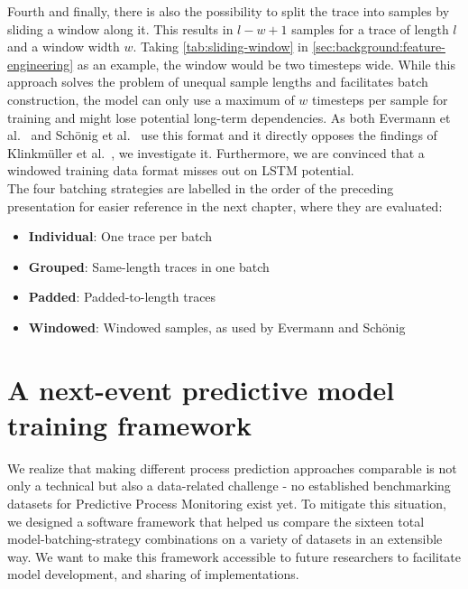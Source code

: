 Fourth and finally, there is also the possibility to split the trace into samples by sliding a window along it. This results in $l-w+1$ samples for a trace of length $l$ and a window width $w$. Taking \autoref{tab:sliding-window} in \autoref{sec:background:feature-engineering} as an example, the window would be two timesteps wide. While this approach solves the problem of unequal sample lengths and facilitates batch construction, the model can only use a maximum of $w$ timesteps per sample for training and might lose potential long-term dependencies. As both Evermann et al.~\cite{evermann2016} and Schönig et al.~\cite{schoenig2018} use this format and it directly opposes the findings of Klinkmüller et al.~\cite{klinkmuller2018reliablemonitoring}, we investigate it. Furthermore, we are convinced that a windowed training data format misses out on LSTM potential.\\

The four batching strategies are labelled in the order of the preceding presentation for easier reference in the next chapter, where they are evaluated:
\begin{itemize}
\item\textbf{Individual}: One trace per batch
\item\textbf{Grouped}: Same-length traces in one batch
\item\textbf{Padded}: Padded-to-length traces
\item\textbf{Windowed}: Windowed samples, as used by Evermann and Schönig
\end{itemize}

\section{A next-event predictive model training framework}
\label{sec:contrib:training-framework}
We realize that making different process prediction approaches comparable is not only a technical but also a data-related challenge - no established benchmarking datasets for Predictive Process Monitoring exist yet.
To mitigate this situation, we designed a software framework that helped us compare the sixteen total model-batching-strategy combinations on a variety of datasets in an extensible way. We want to make this framework accessible to future researchers to facilitate model development, and sharing of implementations.\\


